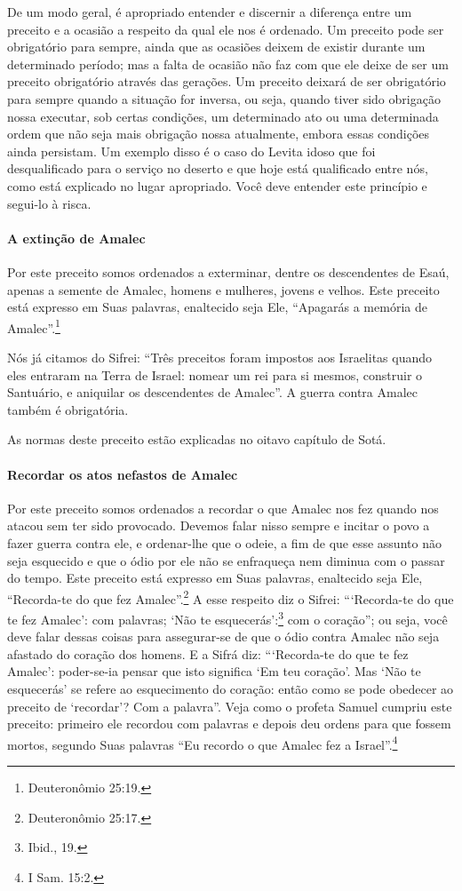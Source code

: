 De um modo geral, é apropriado entender e discernir a diferença
entre um preceito e a ocasião a respeito da qual ele nos é ordenado. Um
preceito pode ser obrigatório para sempre, ainda que as ocasiões deixem de
existir durante um determinado período; mas a falta de ocasião não faz
com que ele deixe de ser um preceito obrigatório através das gerações.
Um preceito deixará de ser obrigatório para sempre quando a situação for
inversa, ou seja, quando tiver sido obrigação nossa executar, sob certas
condições, um determinado ato ou uma determinada ordem que não seja mais
obrigação nossa atualmente, embora essas condições ainda persistam. Um
exemplo disso é o caso do Levita idoso que foi desqualificado para o
serviço no deserto e que hoje está qualificado entre nós, como está
explicado no lugar apropriado. Você deve entender este princípio e
segui-lo à risca.

\paragraph{A extinção de Amalec}

Por este preceito somos ordenados a exterminar, dentre os descendentes
de Esaú, apenas a semente de Amalec, homens e mulheres, jovens e
velhos. Este preceito está expresso em Suas palavras, enaltecido seja
Ele, ``Apagarás a memória de Amalec''.\footnote{Deuteronômio 25:19.}

Nós já citamos do Sifrei: ``Três preceitos foram impostos aos
Israelitas quando eles entraram na Terra de Israel: nomear um rei para
si mesmos, construir o Santuário, e aniquilar os descendentes de
Amalec''. A guerra contra Amalec também é obrigatória.

As normas deste preceito estão explicadas no oitavo capítulo de Sotá.

\paragraph{Recordar os atos nefastos de Amalec}

Por este preceito somos ordenados a recordar o que Amalec nos fez quando
nos atacou sem ter sido provocado. Devemos falar nisso sempre e incitar
o povo a fazer guerra contra ele, e ordenar-lhe que o odeie, a fim de
que esse assunto não seja esquecido e que o ódio por ele não se
enfraqueça nem diminua com o passar do tempo. Este preceito está
expresso em Suas palavras, enaltecido seja Ele, ``Recorda-te do que fez
Amalec''.\footnote{Deuteronômio 25:17.} A esse respeito diz o Sifrei:
```Recorda-te do que te fez Amalec': com palavras; `Não te esquecerás':\footnote{Ibid., 19.} com o coração''; ou seja, você deve falar dessas coisas
para assegurar-se de que o ódio contra Amalec não seja afastado do
coração dos homens. E a Sifrá diz: ```Recorda-te do que te fez Amalec':
poder-se-ia pensar que isto significa `Em teu coração'. Mas `Não te
esquecerás' se refere
ao esquecimento do coração: então como se pode obedecer ao preceito de
`recordar'? Com a palavra''. Veja como o profeta Samuel cumpriu este
preceito:
primeiro ele recordou com palavras e depois deu ordens para que fossem
mortos, segundo Suas palavras ``Eu recordo o que Amalec fez a
Israel''.\footnote{I Sam. 15:2.}

